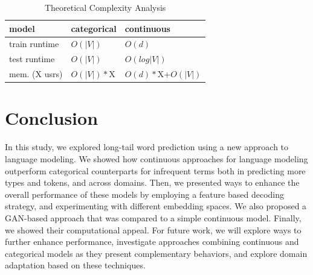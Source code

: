 \documentclass[11pt,a4paper]{article}
\begin{document}

\begin{table}[h]
\begin{center}
\begin{tabular}{lll}
 model &  categorical & continuous \\ \hline
train runtime & $O(|V|)$ & $O(d)$ \\
test runtime & $O(|V|)$ & $O(log|V|)$ \\
mem. (X usrs) & $O(|V|)*$X & $O(d)*$X+$O(|V|)$ \\ 
\end{tabular}
\end{center}
\vspace{-0.1in}
\caption{\label{costs} Theoretical Complexity Analysis}
\vspace{-0.25in}
\end{table}

\section{Conclusion}\label{final}
In this study, we explored long-tail word prediction using a new approach to language modeling.
We showed how continuous approaches for language modeling outperform categorical counterparts for infrequent terms both in predicting more types and tokens, and across domains. Then, 
we presented ways to enhance the overall performance 
of these models by 
employing a feature based decoding strategy, and experimenting with different embedding spaces. We also proposed a GAN-based approach that was compared to
a simple continuous model. Finally, we showed their computational appeal.
For future work, we will explore ways to further enhance performance, investigate approaches combining continuous and categorical models as they present complementary behaviors, and explore domain adaptation based on these techniques.
\end{document}
